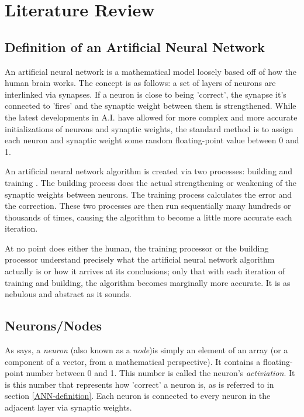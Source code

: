 \documentclass[12pt]{article}
\begin{document}
\section{Literature Review}

\subsection{Definition of an Artificial Neural Network \label{ANN-definition}}

An artificial neural network is a mathematical model loosely based off of how the human brain works. The concept is as follows: a set of layers of neurons are interlinked via synapses. If a neuron is close to being 'correct', the synapse it's connected to 'fires' and the synaptic weight between them is strengthened. While the latest developments in A.I. have allowed for more complex and more accurate initializations of neurons and synaptic weights, the standard method is to assign each neuron and synaptic weight some random floating-point value between 0 and 1.

An artificial neural network algorithm is created via two processes: building and training \textcite{GCPGreyAI}. The building process does the actual strengthening or weakening of the synaptic weights between neurons. The training process calculates the error and the correction. These two processes are then run sequentially many hundreds or thousands of times, causing the algorithm to become a little more accurate each iteration.

At no point does either the human, the training processor or the building processor understand precisely what the artificial neural network algorithm actually is or how it arrives at its conclusions; only that with each iteration of training and building, the algorithm becomes marginally more accurate. It is as nebulous and abstract as it sounds.

\subsection{Neurons/Nodes \label{neuron}}

As \textcite{DeepLearningCh1} says, a \textit{neuron} (also known as a \textit{node})is simply an element of an array (or a component of a vector, from a mathematical perspective). It contains a floating-point number between 0 and 1. This number is called the neuron's \textit{activiation}. It is this number that represents how 'correct' a neuron is, as is referred to in section \ref{ANN-definition}. Each neuron is connected to every neuron in the adjacent layer via synaptic weights.
\end{document}
